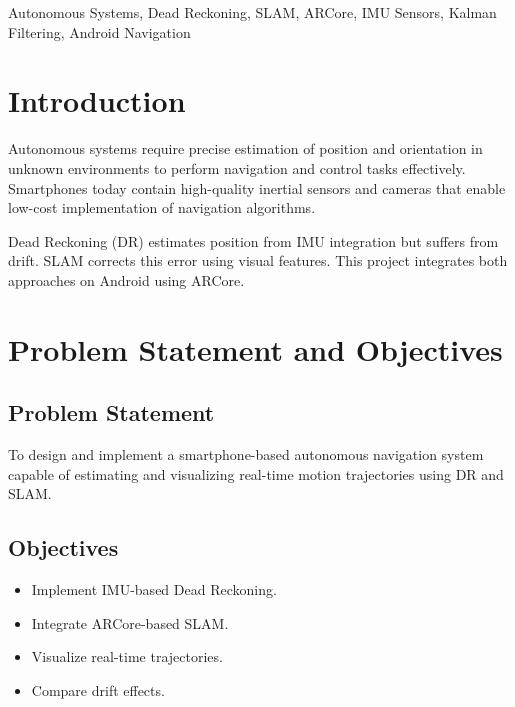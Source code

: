 \documentclass[conference]{IEEEtran}
\begin{document}
\begin{IEEEkeywords}
Autonomous Systems, Dead Reckoning, SLAM, ARCore, IMU Sensors, Kalman Filtering, Android Navigation
\end{IEEEkeywords}

\section{Introduction}
Autonomous systems require precise estimation of position and orientation in unknown environments to perform navigation and control tasks effectively. Smartphones today contain high-quality inertial sensors and cameras that enable low-cost implementation of navigation algorithms.

Dead Reckoning (DR) estimates position from IMU integration but suffers from drift. SLAM corrects this error using visual features. This project integrates both approaches on Android using ARCore.

\section{Problem Statement and Objectives}

\subsection{Problem Statement}
To design and implement a smartphone-based autonomous navigation system capable of estimating and visualizing real-time motion trajectories using DR and SLAM.

\subsection{Objectives}
\begin{itemize}
\item Implement IMU-based Dead Reckoning.
\item Integrate ARCore-based SLAM.
\item Visualize real-time trajectories.
\item Compare drift effects.
\end{itemize}

\end{document}
